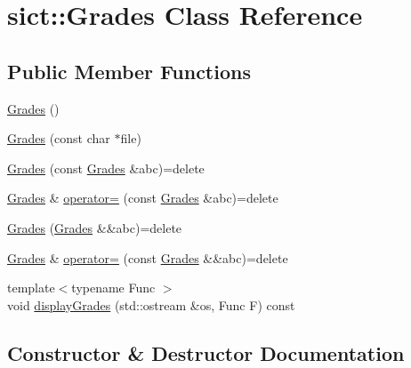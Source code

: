 \hypertarget{classsict_1_1_grades}{}\section{sict\+:\+:Grades Class Reference}
\label{classsict_1_1_grades}
\subsection*{Public Member Functions}
\begin{DoxyCompactItemize}
\item 
\mbox{\hyperlink{classsict_1_1_grades_a887ce1062b823c45ddf834802bd60971}{Grades}} ()
\item 
\mbox{\hyperlink{classsict_1_1_grades_a1b5df6f2878969fd2ac5bb7181e72013}{Grades}} (const char $\ast$file)
\item 
\mbox{\hyperlink{classsict_1_1_grades_a28b396a5f92668d17c77e6e27049ffbd}{Grades}} (const \mbox{\hyperlink{classsict_1_1_grades}{Grades}} \&abc)=delete
\item 
\mbox{\hyperlink{classsict_1_1_grades}{Grades}} \& \mbox{\hyperlink{classsict_1_1_grades_a7fc6251e877862c21863740326a6bbd0}{operator=}} (const \mbox{\hyperlink{classsict_1_1_grades}{Grades}} \&abc)=delete
\item 
\mbox{\hyperlink{classsict_1_1_grades_a12f36a6da97e7ecf0360526e6f766cfa}{Grades}} (\mbox{\hyperlink{classsict_1_1_grades}{Grades}} \&\&abc)=delete
\item 
\mbox{\hyperlink{classsict_1_1_grades}{Grades}} \& \mbox{\hyperlink{classsict_1_1_grades_a7fb3ef65024df1e61764fabfa223fe00}{operator=}} (const \mbox{\hyperlink{classsict_1_1_grades}{Grades}} \&\&abc)=delete
\item 
{\footnotesize template$<$typename Func $>$ }\\void \mbox{\hyperlink{classsict_1_1_grades_ad0af43fb31cb2968265c90f050377f03}{display\+Grades}} (std\+::ostream \&os, Func F) const
\end{DoxyCompactItemize}


\subsection{Constructor \& Destructor Documentation}
\mbox{\label{classsict_1_1_grades_a887ce1062b823c45ddf834802bd60971}} 
